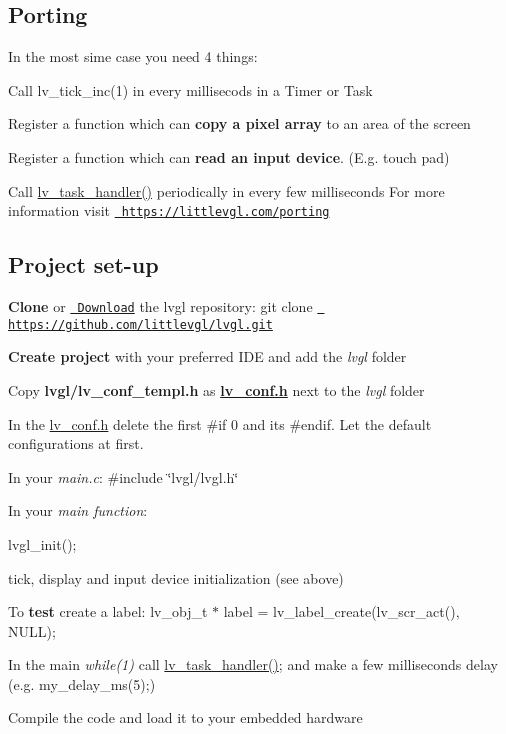 \subsection*{Porting}

In the most sime case you need 4 things\+:
\begin{DoxyEnumerate}
\item Call {\ttfamily lv\+\_\+tick\+\_\+inc(1)} in every millisecods in a Timer or Task
\item Register a function which can {\bfseries{copy a pixel array}} to an area of the screen
\item Register a function which can {\bfseries{read an input device}}. (E.\+g. touch pad)
\item Call {\ttfamily \mbox{\hyperlink{lv__task_8h_a846d4e9f73a30f1aa81088695fc54cad}{lv\+\_\+task\+\_\+handler()}}} periodically in every few milliseconds For more information visit \href{https://littlevgl.com/porting}{\texttt{ https\+://littlevgl.\+com/porting}}
\end{DoxyEnumerate}

\subsection*{Project set-\/up}


\begin{DoxyEnumerate}
\item {\bfseries{Clone}} or \href{https://littlevgl.com/download}{\texttt{ Download}} the lvgl repository\+: {\ttfamily git clone \href{https://github.com/littlevgl/lvgl.git}{\texttt{ https\+://github.\+com/littlevgl/lvgl.\+git}}}
\item {\bfseries{Create project}} with your preferred I\+DE and add the {\itshape lvgl} folder
\item Copy {\bfseries{lvgl/lv\+\_\+conf\+\_\+templ.\+h}} as {\bfseries{\mbox{\hyperlink{lv__conf_8h}{lv\+\_\+conf.\+h}}}} next to the {\itshape lvgl} folder
\item In the \mbox{\hyperlink{lv__conf_8h}{lv\+\_\+conf.\+h}} delete the first {\ttfamily \#if 0} and its {\ttfamily \#endif}. Let the default configurations at first.
\item In your {\itshape main.\+c}\+: \#include \char`\"{}lvgl/lvgl.\+h\char`\"{}
\item In your {\itshape main function}\+:
\begin{DoxyItemize}
\item lvgl\+\_\+init();
\item tick, display and input device initialization (see above)
\end{DoxyItemize}
\item To {\bfseries{test}} create a label\+: {\ttfamily lv\+\_\+obj\+\_\+t $\ast$ label = lv\+\_\+label\+\_\+create(lv\+\_\+scr\+\_\+act(), N\+U\+L\+L);}
\item In the main {\itshape while(1)} call {\ttfamily \mbox{\hyperlink{lv__task_8h_a846d4e9f73a30f1aa81088695fc54cad}{lv\+\_\+task\+\_\+handler()}};} and make a few milliseconds delay (e.\+g. {\ttfamily my\+\_\+delay\+\_\+ms(5);})
\item Compile the code and load it to your embedded hardware
\end{DoxyEnumerate}

